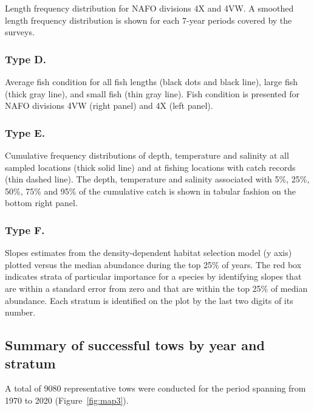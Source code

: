 \documentclass[12pt]{article}\usepackage[]{graphicx}\usepackage[]{color}
\begin{document}
Length frequency distribution for NAFO divisions 4X and 4VW. A smoothed length frequency distribution is shown for each 7-year periods covered by the surveys.

\hypertarget{type-d.}{%
\subsubsection{Type D.}\label{type-d.}}

Average fish condition for all fish lengths (black dots and black line), large fish (thick gray line), and small fish (thin gray line). Fish condition is presented for NAFO divisions 4VW (right panel) and 4X (left panel).

\hypertarget{type-e.}{%
\subsubsection{Type E.}\label{type-e.}}

Cumulative frequency distributions of depth, temperature and salinity at all sampled locations (thick solid line) and at fishing locations with catch records (thin dashed line). The depth, temperature and salinity associated with 5\%, 25\%, 50\%, 75\% and 95\% of the cumulative catch is shown in tabular fashion on the bottom right panel.

\hypertarget{type-f.}{%
\subsubsection{Type F.}\label{type-f.}}

Slopes estimates from the density-dependent habitat selection model (y axis) plotted versus the median abundance during the top 25\% of years. The red box indicates strata of particular importance for a species by identifying slopes that are within a standard error from zero and that are within the top 25\% of median abundance. Each stratum is identified on the plot by the last two digits of its number.

\hypertarget{summary-of-successful-tows-by-year-and-stratum}{%
\subsection{Summary of successful tows by year and stratum}\label{summary-of-successful-tows-by-year-and-stratum}}

A total of 9080 representative tows were conducted for the period spanning from 1970 to 2020 (Figure~\ref{fig:map3}).
\end{document}
